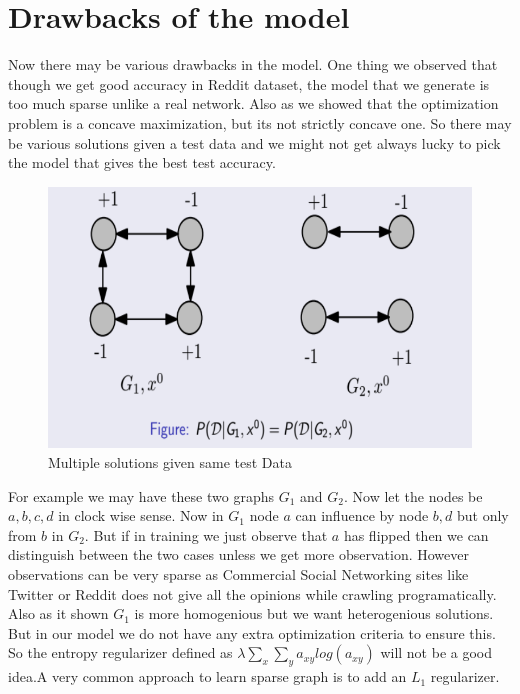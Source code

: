 \section*{Drawbacks of the model}
Now there may be various drawbacks in the model. One thing we observed that though we get good accuracy in Reddit dataset, the model that we generate is too much sparse unlike a real network. Also as we showed that the optimization problem is a concave maximization, but its not strictly concave one. So there may be various solutions given a test data and we might not get always lucky to pick the model that gives the best test accuracy.
\begin{figure}
\centering
\includegraphics[width=\textwidth,height=\textheight,keepaspectratio]{opinion_dynamics/images/non_strict.png}
\caption{Multiple solutions given same test Data}
\label{fig:Reddit_plot}
\end{figure}
For example we may have these two graphs $G_1$ and $G_2$. Now let the nodes be $a,b,c,d$ in clock wise sense. Now in $G_1$ node $a$ can influence by node $b,d$ but only from $b$ in $G_2$. But if in training we just observe that $a$ has flipped then we can distinguish between the two cases unless we get more observation. However observations can be very sparse as Commercial Social Networking sites like Twitter or Reddit does not give all the opinions while crawling programatically. Also as it shown $G_1$ is more homogenious but we want heterogenious solutions. But in our model we do not have any extra optimization criteria to ensure this. So the entropy regularizer defined as $\lambda \displaystyle\sum_x \displaystyle\sum_y a_{xy}log(a_{xy})$ will not be a good idea.A very common approach to learn sparse graph is to add an $L_1$ regularizer.

